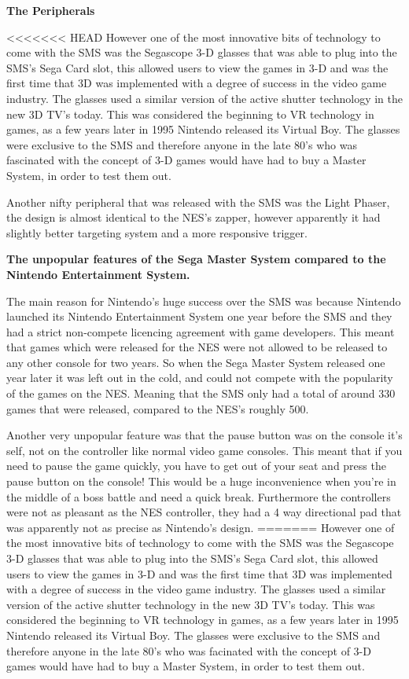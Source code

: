 \documentclass{scrartcl}
\begin{document}
\textbf{The Peripherals} \par

<<<<<<< HEAD
However one of the most innovative bits of technology to come with the SMS was the Segascope 3-D glasses that was able to plug into the SMS's Sega Card slot, this allowed users to view the games in 3-D and was the first time that 3D was implemented with a degree of success in the video game industry. The glasses used a similar version of the active shutter technology in the new 3D TV's today.\cite{SegaScopeTech} This was considered the beginning to VR technology in games, as a few years later in 1995 Nintendo released its Virtual Boy. \cite{Workman} The glasses were exclusive to the SMS and therefore anyone in the late 80's who was fascinated with the concept of 3-D games would have had to buy a Master System, in order to test them out.

Another nifty peripheral that was released with the SMS was the Light Phaser, the design is almost identical to the NES's zapper, however apparently it had slightly better targeting system and a more responsive trigger. 


\textbf{The unpopular features of the Sega Master System compared to the Nintendo Entertainment System.} \par

The main reason for Nintendo’s huge success over the SMS was because Nintendo launched its Nintendo Entertainment System one year before the SMS and they had a strict non-compete licencing agreement with game developers. This meant that games which were released for the NES were not allowed to be released to any other console for two years.\cite{Weiss2009} So when the Sega Master System released one year later it was left out in the cold, and could not compete with the popularity of the games on the NES. Meaning that the SMS only had a total of around 330 games that were released, compared to the NES's roughly 500. \cite{russell}

Another very unpopular feature was that the pause button was on the console it's self, not on the controller like normal video game consoles. This meant that if you need to pause the game quickly, you have to get out of your seat and press the pause button on the console! This would be a huge inconvenience when you're in the middle of a boss battle and need a quick break. Furthermore the controllers were not as pleasant as the NES controller, they had a 4 way directional pad that was apparently not as precise as Nintendo’s design.\cite{Weiss2009}
=======
However one of the most innovative bits of technology to come with the SMS was the Segascope 3-D glasses that was able to plug into the SMS's Sega Card slot, this allowed users to view the games in 3-D and was the first time that 3D was implemented with a degree of success in the video game industry. The glasses used a similar version of the active shutter technology in the new 3D TV's today.\cite{SegaScopeTech} This was considered the beginning to VR technology in games, as a few years later in 1995 Nintendo released its Virtual Boy. \cite{Workman} The glasses were exclusive to the SMS and therefore anyone in the late 80's who was facinated with the concept of 3-D games would have had to buy a Master System, in order to test them out.
\end{document}
